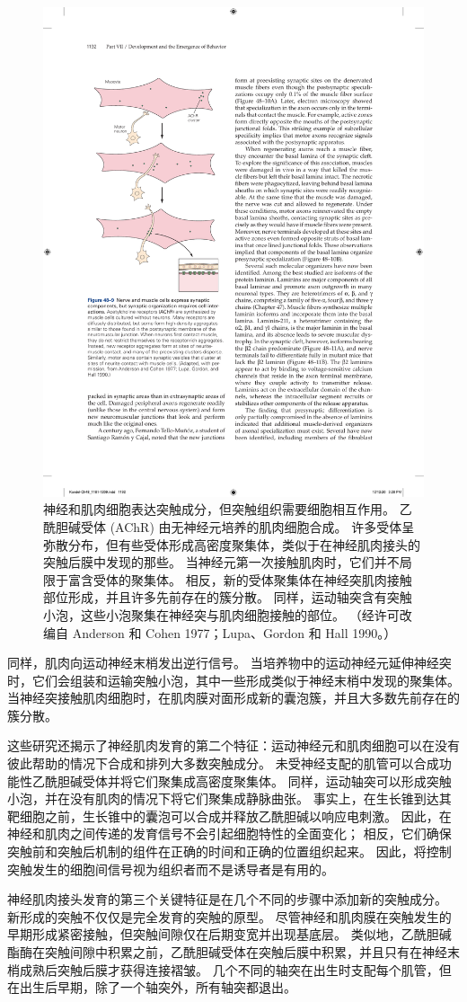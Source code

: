 \begin{figure}[htbp]
	\centering
	\includegraphics[width=0.5\linewidth]{chap48/fig_48_9}
	\caption{神经和肌肉细胞表达突触成分，但突触组织需要细胞相互作用。 乙酰胆碱受体 (AChR) 由无神经元培养的肌肉细胞合成。 许多受体呈弥散分布，但有些受体形成高密度聚集体，类似于在神经肌肉接头的突触后膜中发现的那些。 当神经元第一次接触肌肉时，它们并不局限于富含受体的聚集体。 相反，新的受体聚集体在神经突肌肉接触部位形成，并且许多先前存在的簇分散。 同样，运动轴突含有突触小泡，这些小泡聚集在神经突与肌肉细胞接触的部位。 （经许可改编自 Anderson 和 Cohen 1977；Lupa、Gordon 和 Hall 1990。）}
	\label{fig:48_9}
\end{figure}


同样，肌肉向运动神经末梢发出逆行信号。
当培养物中的运动神经元延伸神经突时，它们会组装和运输突触小泡，其中一些形成类似于神经末梢中发现的聚集体。
当神经突接触肌肉细胞时，在肌肉膜对面形成新的囊泡簇，并且大多数先前存在的簇分散。


这些研究还揭示了神经肌肉发育的第二个特征：运动神经元和肌肉细胞可以在没有彼此帮助的情况下合成和排列大多数突触成分。
未受神经支配的肌管可以合成功能性乙酰胆碱受体并将它们聚集成高密度聚集体。
同样，运动轴突可以形成突触小泡，并在没有肌肉的情况下将它们聚集成静脉曲张。
事实上，在生长锥到达其靶细胞之前，生长锥中的囊泡可以合成并释放乙酰胆碱以响应电刺激。
因此，在神经和肌肉之间传递的发育信号不会引起细胞特性的全面变化；
相反，它们确保突触前和突触后机制的组件在正确的时间和正确的位置组织起来。
因此，将控制突触发生的细胞间信号视为组织者而不是诱导者是有用的。


神经肌肉接头发育的第三个关键特征是在几个不同的步骤中添加新的突触成分。
新形成的突触不仅仅是完全发育的突触的原型。
尽管神经和肌肉膜在突触发生的早期形成紧密接触，但突触间隙仅在后期变宽并出现基底层。
类似地，乙酰胆碱酯酶在突触间隙中积累之前，乙酰胆碱受体在突触后膜中积累，并且只有在神经末梢成熟后突触后膜才获得连接褶皱。
几个不同的轴突在出生时支配每个肌管，但在出生后早期，除了一个轴突外，所有轴突都退出。


